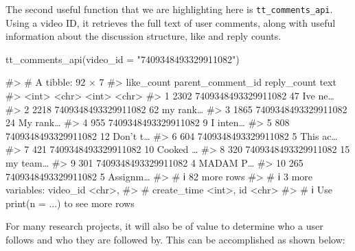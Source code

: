 \documentclass[
  nobib]{ccr}
\newenvironment{Shaded}{\begin{snugshade}}{\end{snugshade}}
\newcommand{\AttributeTok}[1]{\textcolor[rgb]{0.40,0.45,0.13}{#1}}
\newcommand{\CommentTok}[1]{\textcolor[rgb]{0.37,0.37,0.37}{#1}}
\newcommand{\FunctionTok}[1]{\textcolor[rgb]{0.28,0.35,0.67}{#1}}
\newcommand{\NormalTok}[1]{\textcolor[rgb]{0.00,0.23,0.31}{#1}}
\newcommand{\StringTok}[1]{\textcolor[rgb]{0.13,0.47,0.30}{#1}}
\begin{document}
The second useful function that we are highlighting here is
\texttt{tt\_comments\_api}. Using a video ID, it retrieves the full text
of user comments, along with useful information about the discussion
structure, like and reply counts.

\begin{Shaded}
\begin{Highlighting}[]
\FunctionTok{tt\_comments\_api}\NormalTok{(}\AttributeTok{video\_id =} \StringTok{"7409348493329911082"}\NormalTok{)}

\CommentTok{\#\textgreater{} \# A tibble: 92 × 7}
\CommentTok{\#\textgreater{}    like\_count parent\_comment\_id   reply\_count text    }
\CommentTok{\#\textgreater{}         \textless{}int\textgreater{} \textless{}chr\textgreater{}                     \textless{}int\textgreater{} \textless{}chr\textgreater{}   }
\CommentTok{\#\textgreater{}  1       2302 7409348493329911082          47 I\textquotesingle{}ve ne…}
\CommentTok{\#\textgreater{}  2       2218 7409348493329911082          62 my rank…}
\CommentTok{\#\textgreater{}  3       1865 7409348493329911082          24 My rank…}
\CommentTok{\#\textgreater{}  4        955 7409348493329911082           9 I inten…}
\CommentTok{\#\textgreater{}  5        808 7409348493329911082          12 Don’t t…}
\CommentTok{\#\textgreater{}  6        604 7409348493329911082           5 This ac…}
\CommentTok{\#\textgreater{}  7        421 7409348493329911082          10 Cooked …}
\CommentTok{\#\textgreater{}  8        320 7409348493329911082          15 my team…}
\CommentTok{\#\textgreater{}  9        301 7409348493329911082           4 MADAM P…}
\CommentTok{\#\textgreater{} 10        265 7409348493329911082           5 Assignm…}
\CommentTok{\#\textgreater{} \# ℹ 82 more rows}
\CommentTok{\#\textgreater{} \# ℹ 3 more variables: video\_id \textless{}chr\textgreater{},}
\CommentTok{\#\textgreater{} \#   create\_time \textless{}int\textgreater{}, id \textless{}chr\textgreater{}}
\CommentTok{\#\textgreater{} \# ℹ Use \textasciigrave{}print(n = ...)\textasciigrave{} to see more rows}
\end{Highlighting}
\end{Shaded}

For many research projects, it will also be of value to determine who a
user follows and who they are followed by. This can be accomplished as
shown below:
\end{document}
